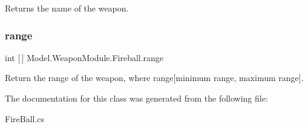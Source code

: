 Returns the name of the weapon. \hypertarget{class_model_1_1_weapon_module_1_1_fireball_aaf028421e893ade01e5283bb4f74be0b}{}\label{class_model_1_1_weapon_module_1_1_fireball_aaf028421e893ade01e5283bb4f74be0b} 
\subsubsection{\texorpdfstring{range}{range}}
{\footnotesize\ttfamily int \mbox{[}$\,$\mbox{]} Model.\+Weapon\+Module.\+Fireball.\+range\hspace{0.3cm}{\ttfamily [get]}}

Return the range of the weapon, where range\mbox{[}minimum range, maximum range\mbox{]}. 

The documentation for this class was generated from the following file\+:\begin{DoxyCompactItemize}
\item 
Fire\+Ball.\+cs\end{DoxyCompactItemize}
